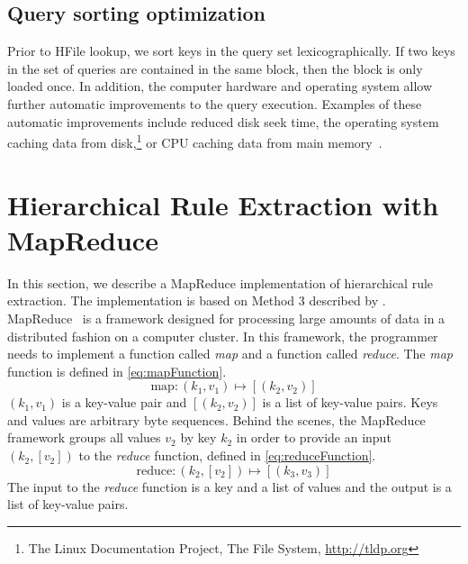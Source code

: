 \subsection{Query sorting optimization}

Prior to HFile lookup, we sort keys in the query set lexicographically. If two
keys in the set of queries are contained in the same block, then the block is
only loaded once. In addition, the computer hardware and operating system allow
further automatic improvements to the query execution. Examples of these
automatic improvements include reduced disk seek time, the operating system
caching data from
disk,\footnote{The Linux Documentation Project, The File System, \url{http://tldp.org}}
or CPU caching data from main memory~\citep{patterson-hennessy:2005:COA}.

\section{Hierarchical Rule Extraction with MapReduce}
\label{sec:rulextractMapReduce}

In this section, we describe a MapReduce implementation of hierarchical rule
extraction. The implementation is based on Method 3 described by
\citet{dyer-cordova-mont-lin:2008:WMT}.
MapReduce~\citep{dean-ghemawat:2008:ACM} is a framework designed for processing
large amounts of data in a distributed fashion on a computer cluster. In this
framework, the programmer needs to implement a function called \emph{map} and
a function called \emph{reduce}. The \emph{map} function is defined in
\autoref{eq:mapFunction}.
%
\begin{equation}
  \text{map} : (k_1, v_1) \longmapsto [(k_2, v_2)]
  \label{eq:mapFunction}
\end{equation}
%
$(k_1, v_1)$ is a key-value pair and $[(k_2, v_2)]$ is a list of
key-value pairs. Keys and values are arbitrary byte sequences. Behind the
scenes, the MapReduce framework groups all values $v_2$ by key $k_2$ in order
to provide an input $(k_2, [v_2])$ to the \emph{reduce} function, defined in
\autoref{eq:reduceFunction}.
%
\begin{equation}
  \text{reduce} : (k_2, [v_2]) \longmapsto [(k_3, v_3)]
  \label{eq:reduceFunction}
\end{equation}
%
The input to the \emph{reduce} function is a key and a list of values and the
output is a list of key-value pairs.

